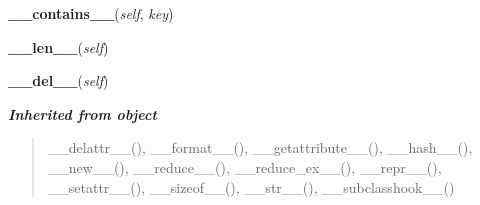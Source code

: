     \vspace{0.5ex}

\hspace{.8\funcindent}\begin{boxedminipage}{\funcwidth}

    \raggedright \textbf{\_\_contains\_\_}(\textit{self}, \textit{key})

\setlength{\parskip}{2ex}
\setlength{\parskip}{1ex}
    \end{boxedminipage}

    \label{pycosmicstar:filedict_old:FileDict:__len__}

    \vspace{0.5ex}

\hspace{.8\funcindent}\begin{boxedminipage}{\funcwidth}

    \raggedright \textbf{\_\_len\_\_}(\textit{self})

\setlength{\parskip}{2ex}
\setlength{\parskip}{1ex}
    \end{boxedminipage}

    \label{pycosmicstar:filedict_old:FileDict:__del__}

    \vspace{0.5ex}

\hspace{.8\funcindent}\begin{boxedminipage}{\funcwidth}

    \raggedright \textbf{\_\_del\_\_}(\textit{self})

\setlength{\parskip}{2ex}
\setlength{\parskip}{1ex}
    \end{boxedminipage}


\large{\textbf{\textit{Inherited from object}}}

\begin{quote}
\_\_delattr\_\_(), \_\_format\_\_(), \_\_getattribute\_\_(), \_\_hash\_\_(), \_\_new\_\_(), \_\_reduce\_\_(), \_\_reduce\_ex\_\_(), \_\_repr\_\_(), \_\_setattr\_\_(), \_\_sizeof\_\_(), \_\_str\_\_(), \_\_subclasshook\_\_()
\end{quote}

